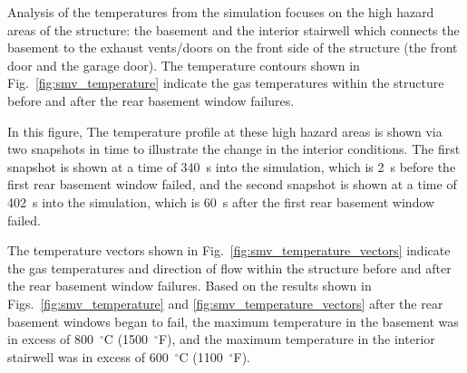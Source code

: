 \documentclass[12pt,oneside]{book}
\begin{document}
Analysis of the temperatures from the simulation focuses on the high hazard areas of the structure: the basement and the interior stairwell which connects the basement to the exhaust vents/doors on the front side of the structure (the front door and the garage door). The temperature contours shown in Fig.~\ref{fig:smv_temperature} indicate the gas temperatures within the structure before and after the rear basement window failures.

In this figure, The temperature profile at these high hazard areas is shown via two snapshots in time to illustrate the change in the interior conditions. The first snapshot is shown at a time of 340~s into the simulation, which is 2~s before the first rear basement window failed, and the second snapshot is shown at a time of 402~s into the simulation, which is 60~s after the first rear basement window failed.

The temperature vectors shown in Fig.~\ref{fig:smv_temperature_vectors} indicate the gas temperatures and direction of flow within the structure before and after the rear basement window failures. Based on the results shown in Figs.~\ref{fig:smv_temperature} and \ref{fig:smv_temperature_vectors} after the rear basement windows began to fail, the maximum temperature in the basement was in excess of 800~$^{\circ}$C (1500~$^{\circ}$F), and the maximum temperature in the interior stairwell was in excess of 600~$^{\circ}$C (1100~$^{\circ}$F).
\end{document}
